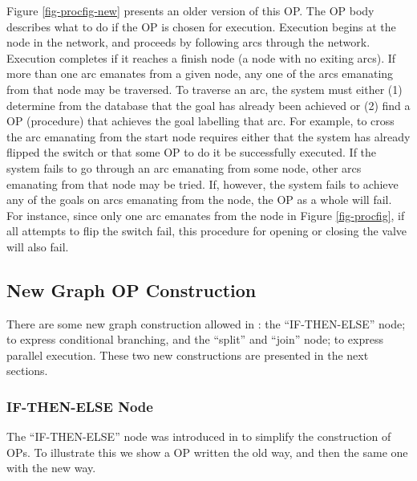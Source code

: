 
Figure \ref{fig-procfig-new} presents an older version of this OP. The OP body
describes what to do if the OP is chosen for execution.  Execution begins at
the  node in the network, and proceeds by following arcs through
the network. Execution completes if it reaches a finish node (a node with no
exiting arcs). If more than one arc emanates from a given node, any one of the
arcs emanating from that node may be traversed. To traverse an arc, the system
must either (1) determine from the database that the goal has already been
achieved or (2) find a OP (procedure) that achieves the goal labelling that
arc. For example, to cross the arc emanating from the start node requires
either that the system has already flipped the switch or that some OP to do it
be successfully executed. If the system fails to go through an arc emanating
from some node, other arcs emanating from that node may be tried.  If, however,
the system fails to achieve any of the goals on arcs emanating from the node,
the OP as a whole will fail. For instance, since only one arc emanates from the
 node in Figure \ref{fig-procfig}, if all attempts to flip the
switch fail, this procedure for opening or closing the valve will also fail.

\subsection{New Graph OP Construction}

There are some new graph construction
allowed in \COPRSDE{}: the ``IF-THEN-ELSE'' node; to express conditional branching, and the
``split'' and ``join'' node; to express parallel execution. These two new
constructions are presented in the next sections.



\subsubsection{IF-THEN-ELSE Node}

The ``IF-THEN-ELSE'' node was introduced in \COPRS{} to simplify the
construction of OPs. To illustrate this we show a OP written the old way, and
then the same one with the new way.


